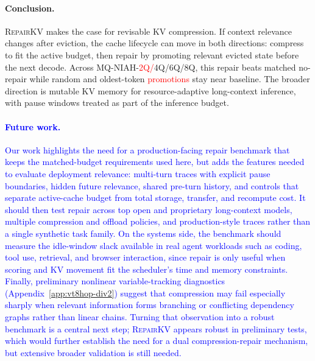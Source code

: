 \documentclass{article}
\newcommand{\repairkv}{\textsc{RepairKV}}
\begin{document}
\paragraph{Conclusion.}
\repairkv{} makes the case for revisable KV compression.
If context relevance changes after eviction, the cache lifecycle can move
in both directions: compress to fit the active budget, then repair by
promoting relevant evicted state before the next decode.
Across MQ-NIAH-\textcolor{red}{2Q/}4Q/6Q/8Q, this repair beats matched no-repair while random
and oldest-token \textcolor{red}{promotions} stay near baseline.
The broader direction is mutable KV memory for resource-adaptive
long-context inference, with pause windows treated as part of the
inference budget.

\paragraph{\textcolor{blue}{Future work.}}
\textcolor{blue}{Our work highlights the need for a production-facing repair
benchmark that keeps the matched-budget requirements used here, but adds the
features needed to evaluate deployment relevance: multi-turn traces with
explicit pause boundaries, hidden future relevance, shared pre-turn history,
and controls that separate active-cache budget from total storage, transfer,
and recompute cost. It should then test repair across top open and proprietary
long-context models, multiple compression and offload policies, and
production-style traces rather than a single synthetic task family. On the
systems side, the benchmark should measure the idle-window slack available in
real agent workloads such as coding, tool use, retrieval, and browser
interaction, since repair is only useful when scoring and KV movement fit the
scheduler's time and memory constraints. Finally, preliminary nonlinear
variable-tracking diagnostics (Appendix~\ref{app:vt8hop-div2}) suggest that
compression may fail especially sharply when relevant information forms
branching or conflicting dependency graphs rather than linear chains. Turning
that observation into a robust benchmark is a central next step; \repairkv{}
appears robust in preliminary tests, which would further establish the need for a dual compression-repair mechanism, but extensive broader validation is still needed.}

\FloatBarrier
\end{document}
